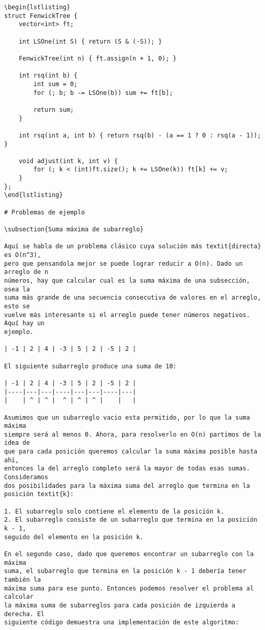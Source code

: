 \documentclass[11pt]{article}
\begin{document}
\begin{verbatim}
\begin{lstlisting}
struct FenwickTree {
    vector<int> ft;

    int LSOne(int S) { return (S & (-S)); }

    FenwickTree(int n) { ft.assign(n + 1, 0); }

    int rsq(int b) {
        int sum = 0;
        for (; b; b -= LSOne(b)) sum += ft[b];

        return sum;
    }

    int rsq(int a, int b) { return rsq(b) - (a == 1 ? 0 : rsq(a - 1)); }

    void adjust(int k, int v) {
        for (; k < (int)ft.size(); k += LSOne(k)) ft[k] += v;
    }
};
\end{lstlisting}

# Problemas de ejemplo

\subsection{Suma máxima de subarreglo}

Aquí se habla de un problema clásico cuya solución más textit{directa} es O(n^3),
pero que pensandola mejor se puede lograr reducir a O(n). Dado un arreglo de n
números, hay que calcular cual es la suma máxima de una subsección, osea la
suma más grande de una secuencia consecutiva de valores en el arreglo, esto se
vuelve más interesante si el arreglo puede tener números negativos. Aquí hay un
ejemplo.

| -1 | 2 | 4 | -3 | 5 | 2 | -5 | 2 |

El siguiente subarreglo produce una suma de 10:

| -1 | 2 | 4 | -3 | 5 | 2 | -5 | 2 |
|----|---|---|----|---|---|----|---|
|    | ^ | ^ |  ^ | ^ | ^ |    |   |

Asumimos que un subarreglo vacio esta permitido, por lo que la suma máxima
siempre será al menos 0. Ahora, para resolverlo en O(n) partimos de la idea de
que para cada posición queremos calcular la suma máxima posible hasta ahí,
entonces la del arreglo completo será la mayor de todas esas sumas. Consideramos
dos posibilidades para la máxima suma del arreglo que termina en la posición textit{k}:

1. El subarreglo solo contiene el elemento de la posición k.
2. El subarreglo consiste de un subarreglo que termina en la posición k - 1,
seguido del elemento en la posición k.

En el segundo caso, dado que queremos encontrar un subarreglo con la máxima
suma, el subarreglo que termina en la posición k - 1 debería tener también la
máxima suma para ese punto. Entonces podemos resolver el problema al calcular
la máxima suma de subarreglos para cada posición de izquierda a derecha. El
siguiente código demuestra una implementación de este algoritmo:


\end{verbatim}
\end{document}
